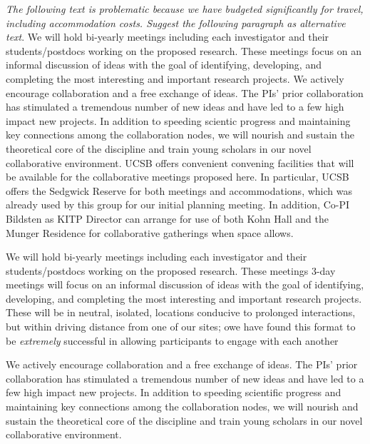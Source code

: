 \emph{The following text is problematic because we have budgeted significantly for travel, including accommodation costs. Suggest the following paragraph as alternative text}. We will hold bi-yearly meetings including each investigator and their students/postdocs working on the proposed research. These meetings focus on an informal discussion of ideas with the goal of identifying, developing, and completing the most interesting and important research projects. We actively encourage collaboration and a free exchange of ideas. The PIs' prior collaboration has stimulated a tremendous number of new ideas and have led to a few high impact new projects. In addition to speeding scientic progress and maintaining key connections among the collaboration nodes, we will nourish and sustain the theoretical core of the discipline and train young scholars in our novel collaborative environment. UCSB offers convenient convening facilities that will be available for the collaborative meetings proposed here. In particular, UCSB offers the Sedgwick Reserve for both meetings and accommodations, which was already used by this group for our initial planning meeting. In addition, Co-PI Bildsten as KITP Director can arrange for use of both Kohn Hall and the Munger Residence for collaborative gatherings when space allows.

We will hold bi-yearly meetings including each investigator and their students/postdocs working on the proposed research. These meetings 3-day meetings will focus on an informal discussion of ideas with the goal of identifying, developing, and completing the most interesting and important research projects. These will be in neutral, isolated, locations conducive to prolonged interactions, but within driving distance from one of our sites; owe have found this format to be \emph{extremely} successful in allowing participants to engage with each another

We actively encourage collaboration and a free exchange of ideas. The PIs' prior collaboration has stimulated a tremendous number of new ideas and have led to a few high impact new projects. In addition to speeding scientific progress and maintaining key connections among the collaboration nodes, we will nourish and sustain the theoretical core of the discipline and train young scholars in our novel collaborative environment. 